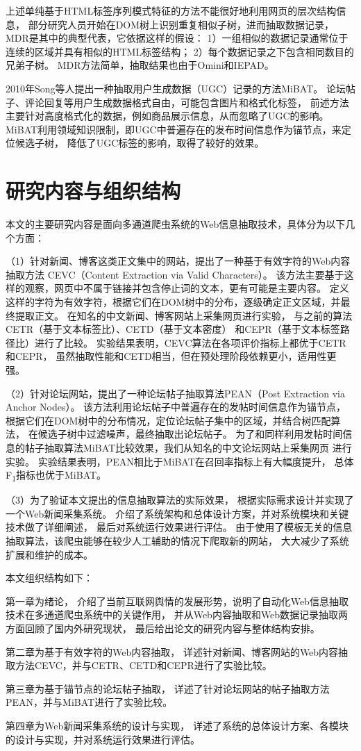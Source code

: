 上述单纯基于HTML标签序列模式特征的方法不能很好地利用网页的层次结构信息，
部分研究人员开始在DOM树上识别重复相似子树，进而抽取数据记录，
MDR是其中的典型代表，它依据这样的假设：
1）一组相似的数据记录通常位于连续的区域并具有相似的HTML标签结构；
2）每个数据记录之下包含相同数目的兄弟子树。
MDR方法简单，抽取结果也由于Omini和IEPAD。

2010年Song等人提出一种抽取用户生成数据（UGC）记录的方法MiBAT。
论坛帖子、评论回复等用户生成数据格式自由，可能包含图片和格式化标签，
前述方法主要针对高度格式化的数据，例如商品展示信息，从而忽略了UGC的影响。
MiBAT利用领域知识限制，即UGC中普遍存在的发布时间信息作为锚节点，来定位候选子树，
降低了UGC标签的影响，取得了较好的效果。

\section{研究内容与组织结构}

本文的主要研究内容是面向多通道爬虫系统的Web信息抽取技术，具体分为以下几个方面：

（1）针对新闻、博客这类正文集中的网站，提出了一种基于有效字符的Web内容抽取方法
CEVC（Content Extraction via Valid Characters）。
该方法主要基于这样的观察，网页中不属于链接并包含停止词的文本，更有可能是主要内容。
定义这样的字符为有效字符，根据它们在DOM树中的分布，逐级确定正文区域，并最终提取正文。
在知名的中文新闻、博客网站上采集网页进行实验，
与之前的算法CETR（基于文本标签比）、CETD（基于文本密度）
和CEPR（基于文本标签路径比）进行了比较。
实验结果表明，CEVC算法在各项评价指标上都优于CETR和CEPR，
虽然抽取性能和CETD相当，但在预处理阶段依赖更小，适用性更强。

（2）针对论坛网站，提出了一种论坛帖子抽取算法PEAN（Post Extraction via Anchor Nodes）。
该方法利用论坛帖子中普遍存在的发帖时间信息作为锚节点，
根据它们在DOM树中的分布情况，定位论坛帖子集中的区域，并结合树匹配算法，
在候选子树中过滤噪声，最终抽取出论坛帖子。
为了和同样利用发帖时间信息的帖子抽取算法MiBAT比较效果，我们从知名的中文论坛网站上采集网页
进行实验。
实验结果表明，PEAN相比于MiBAT在召回率指标上有大幅度提升，
总体F\textsubscript{1}指标也优于MiBAT。

（3）为了验证本文提出的信息抽取算法的实际效果，
根据实际需求设计并实现了一个Web新闻采集系统。
介绍了系统架构和总体设计方案，并对系统模块和关键技术做了详细阐述，
最后对系统运行效果进行评估。
由于使用了模板无关的信息抽取算法，该爬虫能够在较少人工辅助的情况下爬取新的网站，
大大减少了系统扩展和维护的成本。

本文组织结构如下：

第一章为绪论，
介绍了当前互联网舆情的发展形势，说明了自动化Web信息抽取技术在多通道爬虫系统中的关键作用，
并从Web内容抽取和Web数据记录抽取两方面回顾了国内外研究现状，
最后给出论文的研究内容与整体结构安排。

第二章为基于有效字符的Web内容抽取，
详述针对新闻、博客网站的Web内容抽取方法CEVC，并与CETR、CETD和CEPR进行了实验比较。

第三章为基于锚节点的论坛帖子抽取，
详述了针对论坛网站的帖子抽取方法PEAN，并与MiBAT进行了实验比较。

第四章为Web新闻采集系统的设计与实现，
详述了系统的总体设计方案、各模块的设计与实现，并对系统运行效果进行评估。
